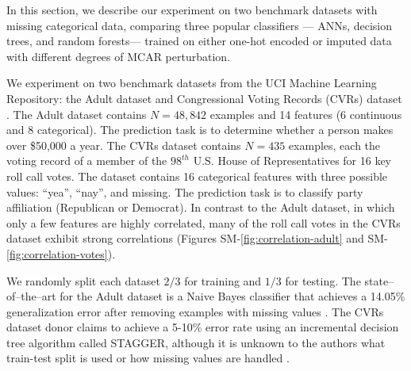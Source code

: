 \documentclass[10pt]{book}
\theoremstyle{definition}
\begin{document}
\par


\setcounter{chapter}{3}
\setcounter{equation}{0} %

In this section, we describe our experiment on two benchmark datasets with missing categorical data, comparing three popular classifiers --- ANNs, decision trees, and random forests--- trained on either one-hot encoded or imputed data with different degrees of MCAR perturbation.

\par
{}

We experiment on two benchmark datasets from the UCI Machine Learning Repository: the Adult dataset and Congressional Voting Records (CVRs) dataset \citep{Lichman2013}. The Adult dataset contains $N=48,842$ examples and 14 features (6 continuous and 8 categorical). The prediction task is to determine whether a person makes over \$50,000 a year. The CVRs dataset contains $N=435$ examples, each the voting record of a member of the $98^{th}$ U.S. House of Representatives for 16 key roll call votes. The dataset contains 16 categorical features with three possible values: ``yea'', ``nay'', and missing. The prediction task is to classify party affiliation (Republican or Democrat). In contrast to the Adult dataset, in which only a few features are highly correlated, many of the roll call votes in the CVRs dataset exhibit strong correlations (Figures SM-\ref{fig:correlation-adult} and SM-\ref{fig:correlation-votes}).

We randomly split each dataset $2/3$ for training and $1/3$ for testing. The state--of--the--art for the Adult dataset is a Naive Bayes classifier that achieves a 14.05\% generalization error after removing examples with missing values \citep{kohavi1996}. The CVRs dataset donor claims to achieve a 5-10\% error rate using an incremental decision tree algorithm called STAGGER, although it is unknown to the authors what train-test split is used or how missing values are handled \citep{schlimmer1987,schlimmer1986}.

\par
{}
\end{document}
